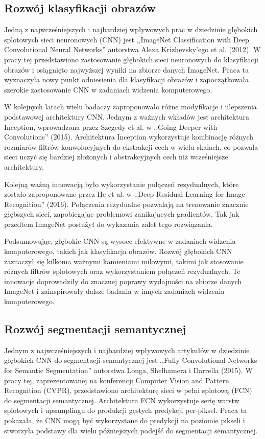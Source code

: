 \subsection{Rozwój klasyfikacji obrazów}
Jedną z najwcześniejszych i najbardziej wpływowych prac w dziedzinie głębokich splotowych sieci neuronowych (CNN) jest ,,ImageNet Classification with Deep Convolutional Neural Networks'' autorstwa Alexa Krizhevsky'ego et al. (2012)\cite{krizhevsky2017imagenet}. W pracy tej przedstawiono zastosowanie głębokich sieci neuronowych do klasyfikacji obrazów i osiągnięto najwyższej wyniki na zbiorze danych ImageNet. Praca ta wyznaczyła nowy punkt odniesienia dla klasyfikacji obrazów i zapoczątkowała szerokie zastosowanie CNN w zadaniach widzenia komputerowego.

W kolejnych latach wielu badaczy zaproponowało różne modyfikacje i ulepszenia podstawowej architektury CNN. Jednym z ważnych wkładów jest architektura Inception, wprowadzona przez Szegedy et al. w ,,Going Deeper with Convolutions'' (2015)\cite{szegedy2015going}. Architektura Inception wykorzystuje kombinację różnych rozmiarów filtrów konwolucyjnych do ekstrakcji cech w wielu skalach, co pozwala sieci uczyć się bardziej złożonych i abstrakcyjnych cech niż wcześniejsze architektury.

Kolejną ważną innowacją było wykorzystanie połączeń rezydualnych, które zostało zaproponowane przez He et al. w ,,Deep Residual Learning for Image Recognition'' (2016)\cite{he2016deep}. Połączenia rezydualne pozwalają na trenowanie znacznie głębszych sieci, zapobiegając problemowi zanikających gradientów. Tak jak przedtem ImageNet posłużył do wykazania zalet tego rozwiązania.

Podsumowując, głębokie CNN są wysoce efektywne w zadaniach widzenia komputerowego, takich jak klasyfikacja obrazów. Rozwój głębokich CNN zaznaczył się kilkoma ważnymi kamieniami milowymi, takimi jak stosowanie różnych filtrów splotowych oraz wykorzystaniem połączeń rezydualnych. Te innowacje doprowadziły do znacznej poprawy wydajności na zbiorze danych ImageNet i zainspirowały dalsze badania w innych zadaniach widzenia komputerowego.
\subsection{Rozwój segmentacji semantycznej}
Jednym z najwcześniejszych i najbardziej wpływowych artykułów w dziedzinie głębokich CNN do segmentacji semantycznej jest ,,Fully Convolutional Networks for Semantic Segmentation'' autorstwa Longa, Shelhamera i Darrella (2015)\cite{fcn}. W pracy tej, zaprezentowanej na konferencji Computer Vision and Pattern Recognition (CVPR), przedstawiono architekturę sieci w pełni splotową (FCN) do segmentacji semantycznej. Architektura FCN wykorzystuje serię warstw splotowych i upsamplingu do produkcji gęstych predykcji per-piksel. Praca ta pokazała, że CNN mogą być wykorzystane do predykcji na poziomie pikseli i stworzyła podstawy dla wielu późniejszych podejść do segmentacji semantycznej.

